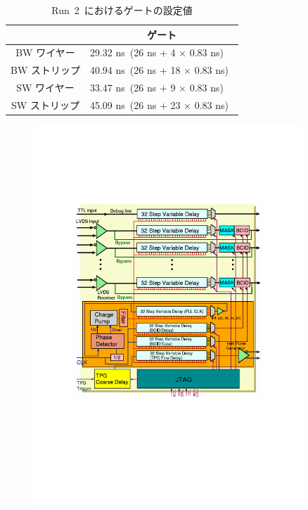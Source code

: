 \begin{table}[tbp]
	\centering
	\begin{tabular}{c|l}\hline
	& \multicolumn{1}{c}{ゲート} \\ \hline
	BW ワイヤー & 29.32 ns~(26 ns + 4 × 0.83 ns)~\\
	BW ストリップ & 40.94 ns~(26 ns + 18 × 0.83 ns)~\\
	SW ワイヤー & 33.47 ns~(26 ns + 9 × 0.83 ns)~\\
	SW ストリップ & 45.09 ns~(26 ns + 23 × 0.83 ns)~\\ \hline
	\end{tabular}
	\caption{Run~2~におけるゲートの設定値}
	\label{tb:BCIDGate}
\end{table}

\begin{figure}[H]
		\begin{minipage}{0.49\hsize}
		\centering
        \includegraphics[width=0.9\textwidth,page=3]{img/pdf/PP.pdf}
        \subcaption{}
        \end{minipage}

\end{figure}
